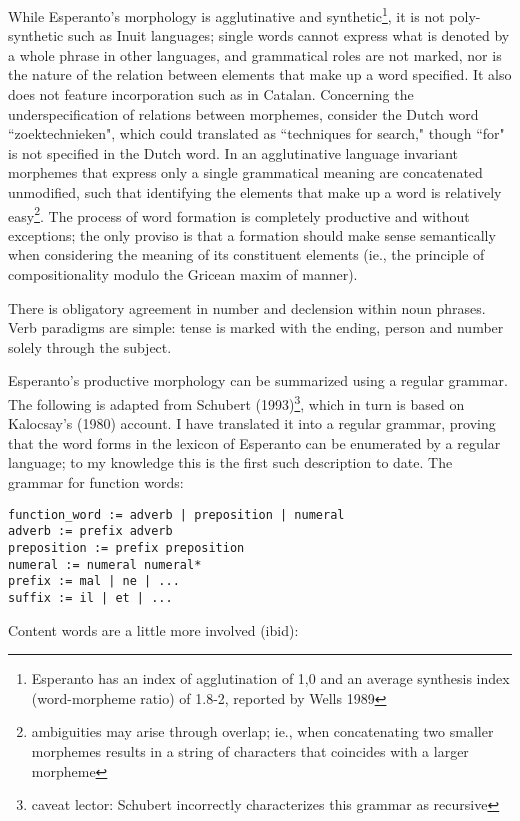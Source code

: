 \documentclass[10pt,a4paper]{article}
\begin{document}
While Esperanto's morphology is agglutinative and synthetic\footnote{Esperanto
has an index of agglutination of 1,0 and an average synthesis index
(word-morpheme ratio) of 1.8-2, reported by Wells 1989}, it is not
poly-synthetic such as Inuit languages; single words cannot express what is
denoted by a whole phrase in other languages, and grammatical roles are not
marked, nor is the nature of the relation between elements that make up a word
specified. It also does not feature incorporation such as in Catalan.
Concerning the underspecification of relations between morphemes, consider the
Dutch word ``zoektechnieken", which could translated as ``techniques for search,"
though ``for" is not specified in the Dutch word. In an agglutinative language
invariant morphemes that express only a single grammatical meaning are
concatenated unmodified, such that identifying the elements that make up a word
is relatively easy\footnote{ambiguities may arise through overlap; ie., when
concatenating two smaller morphemes results in a string of characters that
coincides with a larger morpheme}. The process of word formation is completely
productive and without exceptions; the only proviso is that a formation should
make sense semantically when considering the meaning of its constituent
elements (ie., the principle of compositionality modulo the Gricean maxim of
manner). 

There is obligatory agreement in number and declension within noun phrases.
Verb paradigms are simple: tense is marked with the ending, person and number
solely through the subject.

Esperanto's productive morphology can be summarized using a regular
grammar. The following is adapted from Schubert (1993)\footnote{caveat lector:
Schubert incorrectly characterizes this grammar as recursive}, which in turn is
based on Kalocsay's (1980) account. I have translated it into a regular
grammar, proving that the word forms in the lexicon of Esperanto can be
enumerated by a regular language; to my knowledge this is the first such
description to date.  The grammar for function words: 

\begin{verbatim}
function_word := adverb | preposition | numeral
adverb := prefix adverb
preposition := prefix preposition
numeral := numeral numeral*
prefix := mal | ne | ...
suffix := il | et | ...
\end{verbatim}

Content words are a little more involved (ibid):
\end{document}
